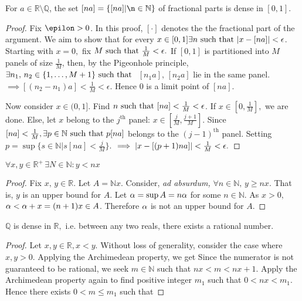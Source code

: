 \begin{theorem}
    For $a\in\mathbb{R}\setminus\mathbb{Q}$, the set $[na]=\left\{[na]|\n\in\mathbb{N}\right\}$ of fractional parts is dense in $[0,1]$.
\end{theorem}
\begin{proof}
    Fix $\epilon>0$. In this proof, $[\cdot]$ denotes the the fractional part of the argument. We aim to show that for every $x\in[0,1]\exists n\text{ such that } \abs{x-[na]}<\epsilon$. Starting with $x=0,$ fix $M\text{ such that }\frac{1}{M}<\epsilon.$ If $[0,1]$ is partitioned into $M$ panels of size $\frac{1}{M}$, then, by the Pigeonhole principle, $\exists n_1,\,n_2\in\{1,\dotsc,M+1\}\text{ such that }$ $[n_1a],\,[n_2a]$ lie in the same panel. $\implies [(n_2-n_1)a]<\frac{1}{M}<\epsilon.$ Hence $0$ is a limit point of $[na]$.
    
    Now consider $x\in(0,1]$. Find $n\text{ such that }[na]<\frac{1}{M}<\epsilon$. If $x\in[0,\frac{1}{M}],$ we are done. Else, let $x$ belong to the $j^\mathrm{th}$ panel: $x\in[\frac{j}{M},\frac{j+1}{M}]$. Since $[na]<\frac{1}{M},\exists p\in\mathbb{N}\text{ such that } p[na]$ belongs to the $(j-1)^\mathrm{th}$ panel. Setting $p=\sup\{s\in\mathbb{N}|s[na]<\frac{j}{M}\}$. $\implies \abs{x - [(p+1)na]}<\frac{1}{M}<\epsilon.$
\end{proof}


\begin{theorem}
   $\forall x,y\in\mathbb{R}^+\,\exists N\in\mathbb{N}:y<nx$ 
\end{theorem}
\begin{proof}
   Fix $x,\,y\in\mathbb{R}$. Let $A=\mathbb{N}x$. Consider, \textit{ad absurdum,} $\forall n\in\mathbb{N},\,y\geq nx.$ That is, $y$ is an upper bound for $A.$ Let $\alpha=\sup{A}=n\alpha$ for some $n\in\mathbb{N}.$ As $x>0,$ $\alpha<\alpha+x=(n+1)x\in A$. Therefore $\alpha$ is not an upper bound for $A.$
\end{proof}

\begin{theorem}
   $\mathbb{Q}$ is dense in $\mathbb{R},$ i.e. between any two reals, there exists a rational number.
\end{theorem}
\begin{proof}
   Let $x,y\in\mathbb{R},x<y.$ Without loss of generality, consider the case where $x,y>0.$ Applying the Archimedean property, we get
   Since the numerator is not guaranteed to be rational, we seek $m\in\mathbb{N}$ such that $nx<m<nx+1$. Apply the Archimedean property again to find positive integer $m_1$ such that $0<nx<m_1.$ Hence there exists $0<m\leq m_1$ such that
\end{proof}

